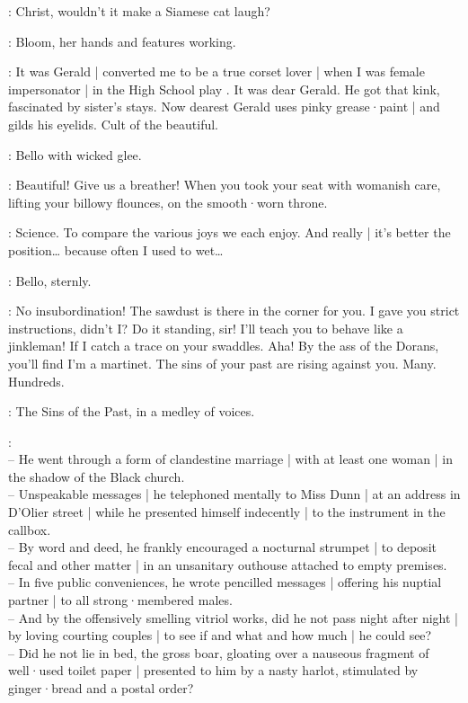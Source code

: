 \Bello:
Christ,
wouldn't it make a Siamese cat laugh?

:
Bloom,
her hands and features working.

\Bloom:
It was Gerald |
converted me to be a true corset lover |
%
when I was female impersonator |
in the High School play .
It was dear Gerald.
He got that kink,
fascinated by sister's stays.
Now dearest Gerald uses pinky grease·paint |
and gilds his eyelids.
Cult of the beautiful.

:
Bello with wicked glee.

\Bello:
Beautiful!
Give us a breather!
When you took your seat with womanish care,
lifting your billowy flounces,
on the smooth·worn throne.

\Bloom:
Science.
To compare the various joys we each enjoy.
And really |
it's better the position…
%
because often I used to wet…

:
Bello,
sternly.

\Bello:
No insubordination!
The sawdust is there in the corner for you.
I gave you strict instructions,
didn't I?
Do it standing,
sir!
I'll teach you to behave like a jinkleman!
If I catch a trace on your swaddles.
Aha!
By the ass of the Dorans,
you'll find I'm a martinet.
The sins of your past are rising against you.
Many.
Hundreds.


:
The Sins of the Past,
in a medley of voices.

\SinsPast:\\
-- He went through a form of clandestine marriage |
with at least one woman |
in the shadow of the Black church.\\
-- Unspeakable messages |
he telephoned mentally to Miss Dunn |
%
at an address in D'Olier street |
while he presented himself indecently |
to the instrument in the callbox.\\
-- By word and deed,
he frankly encouraged a nocturnal strumpet |
to deposit fecal and other matter |
in an unsanitary outhouse attached to empty premises.\\
-- In five public conveniences,
he wrote pencilled messages |
offering his nuptial partner |
to all strong·membered males.\\
-- And by the offensively smelling vitriol works,
did he not pass night after night |
by loving courting couples |
to see if and what and how much |
he could see?\\
-- Did he not lie in bed,
the gross boar,
gloating over a nauseous fragment of well·used toilet paper |
presented to him by a nasty harlot,
stimulated by ginger·bread and a postal order?%

